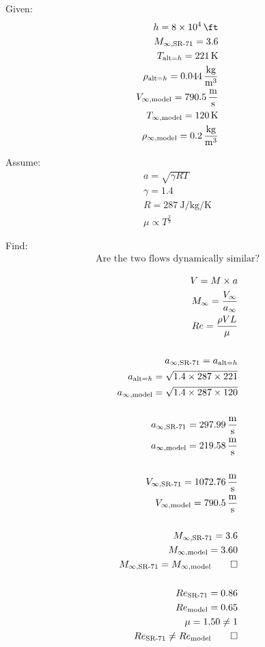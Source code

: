\begin{hwkProblem}{1}{}
	Given:
	\begin{align*}
		h = \qty{8e4}{\ft} \\
		M_{\infty, \text{SR-71}} = \qty{3.6}{} \\
		T_{\text{alt} = h} = \qty{221}{\K} \\
		\rho_{\text{alt} = h} = \qty{0.044}{\kg \per \cubic \m} \\
		V_{\infty, \text{model}} = \qty{790.5}{\m \per \s} \\
		T_{\infty, \text{model}} = \qty{120}{\K} \\
		\rho_{\infty, \text{model}} = \qty{0.2}{\kg \per \cubic \m} \\
	\end{align*}

	Assume:
	\begin{align*}
		a = \sqrt{\gamma R T} \\
		\gamma = 1.4 \\ 
		R = \qty{287}{\J \per \kg \per \K} \\
		\mu \propto T^{\frac{2}{3}}
	\end{align*}

	Find:
	\begin{align*}
		\text{Are the two flows dynamically similar?}
	\end{align*}

	\hwkSol
	\begin{align*}
		V = M \times a \\
		M_{\infty} = \frac{V_{\infty}}{a_{\infty}} \\
		Re = \frac{\rho V L}{\mu} \\
		\\
		a_{\infty, \text{SR-71}} = a_{\text{alt} = h} \\
		a_{\text{alt} = h} = \sqrt{1.4 \times 287 \times 221} \\
		a_{\infty, \text{model}} = \sqrt{1.4 \times 287 \times 120} \\
		\\
		a_{\infty, \text{SR-71}} = \qty{297.99}{\m \per \s} \\
		a_{\infty, \text{model}} = \qty{219.58}{\m \per \s} \\
		\\
		V_{\infty, \text{SR-71}} = \qty{1072.76}{\m \per \s} \\
		V_{\infty, \text{model}} = \qty{790.5}{\m \per \s} \\
		\\
		M_{\infty, \text{SR-71}} = \qty{3.6}{} \\
		M_{\infty, \text{model}} = \qty{3.60}{} \\
		M_{\infty, \text{SR-71}} = M_{\infty, \text{model}} \qed \\
		\\
		Re_{\text{SR-71}} = \qty{0.86}{} \\
		Re_{\text{model}} = \qty{0.65}{} \\
		\mu = \qty{1.50}{} \neq 1 \\
		Re_{\text{SR-71}} \neq Re_{\text{model}} \qed
	\end{align*}


\end{hwkProblem}
